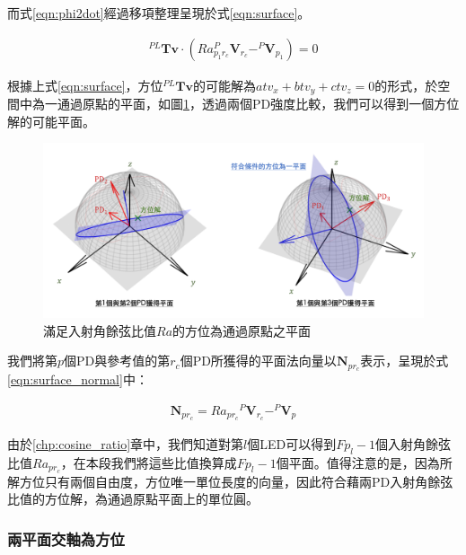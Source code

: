         \noindent 
        而式\ref{eqn:phi2dot}經過移項整理呈現於式\ref{eqn:surface}。

            \begin{gather}
                 \label{eqn:surface}
                 ^{PL}\boldsymbol{Tv} \cdot(Ra_{p_1r_c} ^P\boldsymbol{V}_{r_c}-
                 ^P\boldsymbol{V}_{p_1})=0
            \end{gather}

        根據上式\ref{eqn:surface}，方位$^{PL}\boldsymbol{Tv}$的可能解為$atv_x+btv_y+ctv_z=0$的形式，於空間中為一通過原點的平面，如圖\ref{pic:solve_surface}，透過兩個PD強度比較，我們可以得到一個方位解的可能平面。
       

       \begin{figure}[htpb]
        \centering
        \includegraphics[width=14cm]{ch3pic/solve_surface.png}
        \caption{滿足入射角餘弦比值$Ra$的方位為通過原點之平面}
        \label{pic:solve_surface}
        \end{figure}

         
        我們將第$p$個PD與參考值的第$r_c$個PD所獲得的平面法向量以$\boldsymbol{N}_{pr_c}$表示，呈現於式\ref{eqn:surface_normal}中：
        
        \begin{gather}
            \label{eqn:surface_normal}
            \boldsymbol{N}_{pr_c}  = {Ra_{pr_c}}{} ^P\boldsymbol{V}_{r_c}-
            ^P\boldsymbol{V}_{p}
       \end{gather}
        
        \noindent 由於\ref{chp:cosine_ratio}章中，我們知道對第$l$個LED可以得到$Fp_l-1$個入射角餘弦比值$Ra_{pr_c}$，在本段我們將這些比值換算成$Fp_l-1$個平面。值得注意的是，因為所解方位只有兩個自由度，方位唯一單位長度的向量，因此符合藉兩PD入射角餘弦比值的方位解，為通過原點平面上的單位圓。


    \subsubsection{兩平面交軸為方位}
    \label{chp:solve_axis}

